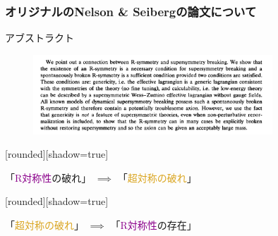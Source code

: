 \documentclass[
  unicode,a4paper,9pt,
  xcolor = {dvipsnames,svgnames},
  hyperref ={colorlinks=true,citecolor=Navy,linkcolor=NavyBlue,urlcolor=purple},
  ja=standard,lualatex
]{beamer}
\begin{document}
\begin{frame}
  \frametitle{オリジナルのNelson \& Seibergの論文について}
  アブストラクト

  \begin{figure}
    \centering
    \includegraphics[width=0.8\textwidth]{fig/Nelson1993nfabst.PNG}
  \end{figure}

  [rounded][shadow=true]
  \begin{block}{}
    \centering
    「\textcolor{DarkMagenta}{R対称性}の破れ」
    $\implies$
    「\textcolor{Goldenrod}{超対称の破れ}」
  \end{block}
  [rounded][shadow=true]
  \begin{block}{}
    \centering
    「\textcolor{Goldenrod}{超対称の破れ}」
    $\implies$
    「\textcolor{DarkMagenta}{R対称性}の存在」
  \end{block}

\end{frame}
\end{document}
